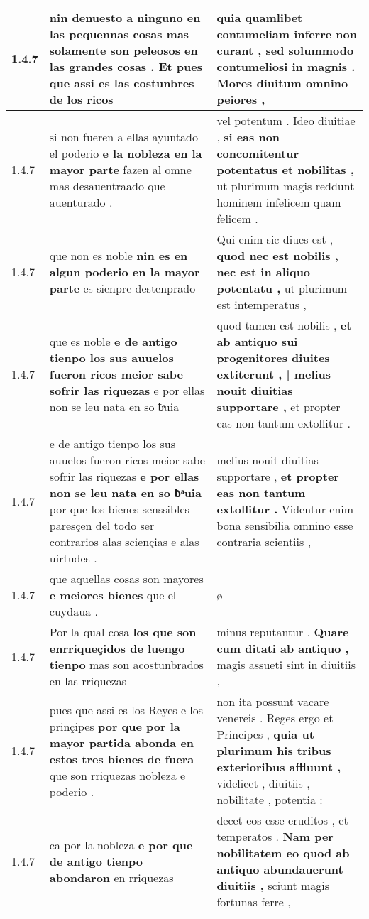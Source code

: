 \begin{tabular}{|p{1cm}|p{6.5cm}|p{6.5cm}|}
1.4.7 & nin denuesto a ninguno en las pequennas cosas \textbf{ mas solamente son peleosos en las grandes cosas . } Et pues que assi es las costunbres de los ricos & quia quamlibet contumeliam inferre non curant , \textbf{ sed solummodo contumeliosi in magnis . } Mores diuitum omnino peiores , \\\hline
1.4.7 & si non fueren a ellas ayuntado el poderio \textbf{ e la nobleza en la mayor parte } fazen al omne mas desauentraado que auenturado . & vel potentum . Ideo diuitiae , \textbf{ si eas non concomitentur potentatus et nobilitas , } ut plurimum magis reddunt hominem infelicem quam felicem . \\\hline
1.4.7 & que non es noble \textbf{ nin es en algun poderio en la mayor parte } es sienpre destenprado & Qui enim sic diues est , \textbf{ quod nec est nobilis , nec est in aliquo potentatu , } ut plurimum est intemperatus , \\\hline
1.4.7 & que es noble \textbf{ e de antigo tienpo los sus auuelos fueron ricos meior sabe sofrir las riquezas } e por ellas non se leu nata en so ƀͣuia & quod tamen est nobilis , \textbf{ et ab antiquo sui progenitores diuites extiterunt , | melius nouit diuitias supportare , } et propter eas non tantum extollitur . \\\hline
1.4.7 & e de antigo tienpo los sus auuelos fueron ricos meior sabe sofrir las riquezas \textbf{ e por ellas non se leu nata en so ƀͣuia } por que los bienes senssibles paresçen del todo ser contrarios alas sciençias e alas uirtudes . & melius nouit diuitias supportare , \textbf{ et propter eas non tantum extollitur . } Videntur enim bona sensibilia omnino esse contraria scientiis , \\\hline
1.4.7 & que aquellas cosas son mayores \textbf{ e meiores bienes } que el cuydaua . & ø \\\hline
1.4.7 & Por la qual cosa \textbf{ los que son enrriqueçidos de luengo tienpo } mas son acostunbrados en las rriquezas & minus reputantur . \textbf{ Quare cum ditati ab antiquo , } magis assueti sint in diuitiis , \\\hline
1.4.7 & pues que assi es los Reyes e los prinçipes \textbf{ por que por la mayor partida abonda en estos tres bienes de fuera } que son rriquezas nobleza e poderio . & non ita possunt vacare venereis . Reges ergo et Principes , \textbf{ quia ut plurimum his tribus exterioribus affluunt , } videlicet , diuitiis , nobilitate , potentia : \\\hline
1.4.7 & ca por la nobleza \textbf{ e por que de antigo tienpo abondaron } en rriquezas & decet eos esse eruditos , et temperatos . \textbf{ Nam per nobilitatem eo quod ab antiquo abundauerunt diuitiis , } sciunt magis fortunas ferre , \\\hline

\end{tabular}
